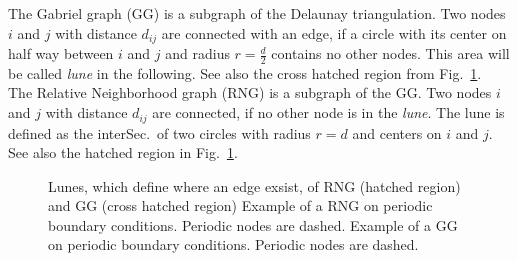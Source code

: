     The Gabriel graph (GG) \cite{Gabriel1969} is a subgraph of the
    Delaunay triangulation. Two nodes \(i\) and \(j\) with distance
    \(d_{ij}\) are connected with an edge, if a circle with its
    center on half way between \(i\) and \(j\) and radius
    \(r = \frac d 2\) contains no other nodes. This area will be
    called \emph{lune} in the following. See also the cross hatched region
    from Fig.\ \ref{fig:lunes}.\\
    The Relative Neighborhood graph (RNG) \cite{Toussaint1980} is a
    subgraph of the GG. Two nodes \(i\) and \(j\) with
    distance \(d_{ij}\) are connected, if no other node is in the
    \emph{lune}. The lune is defined as the interSec.\ of two
    circles with radius \(r = d\) and centers on \(i\) and \(j\).
    See also the hatched region in Fig.\ \ref{fig:lunes}.
    \begin{figure}[htbp]
        \centering
        \caption[Gabriel - and Relative Neighborhood Graph]
        {
             Lunes, which define where an edge
                exsist, of RNG (hatched region) and GG (cross hatched region)
             Example of a RNG on periodic
                boundary conditions. Periodic nodes are dashed.
             Example of a GG on
                periodic boundary conditions. Periodic nodes are dashed.
        }
        \label{fig:lunes}
    \end{figure}\\
